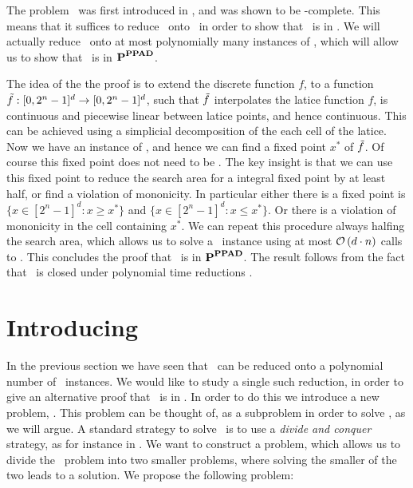 The problem \Brouwer\ was first introduced in , and was shown to be \PPAD-complete. This means that it suffices to reduce \Tarski\ onto \Brouwer\ in order to show that \Tarski\ is in \PPAD. We will actually reduce \Tarski\ onto at most polynomially many instances of \Brouwer, which will allow us to show that \Tarski\ is in $\textbf{P}^{\textbf{PPAD}}$.

The idea of the the proof is to extend the discrete function $f$, to a function $\Tilde{f} : [0, 2^n - 1]^d \rightarrow [0, 2^n - 1]^d$, such that $\Tilde{f}$ interpolates the latice function $f$, is continuous and piecewise linear between latice points, and hence continuous. This can be achieved using a simplicial decomposition of the each cell of the latice. Now we have an instance of \Brouwer, and hence we can find a fixed point $x^*$ of $\Tilde{f}$. Of course this fixed point does not need to be .
The key insight is that we can use this fixed point to reduce the search area for a integral fixed point by at least half, or find a violation of mononicity. In particular either there is a fixed point is $\{x \in [2^n-1]^d : x \geq x^*\}$ and $\{x \in [2^n-1]^d : x \leq x^*\}$. Or there is a violation of mononicity in the cell containing $x^*$.
We can repeat this procedure always halfing the search area, which allows us to solve a \Tarski\ instance using at most $\mathcal{O}\left(d \cdot n\right)$ calls to \Brouwer. This concludes the proof that \Tarski\ is in $\textbf{P}^{\textbf{PPAD}}$. The result follows from the fact that \PPAD\ is closed under polynomial time reductions .

\section{Introducing \Tarskistar}

In the previous section we have seen that \Tarski\ can be reduced onto a polynomial number of \Brouwer\ instances. We would like to study a single such reduction, in order to give an alternative proof that \Tarski\ is in \PPAD. In order to do this we introduce a new problem, \Tarskistar. This problem can be thought of, as a subproblem in order to solve \Tarski, as we will argue. A standard strategy to solve \Tarski\ is to use a \emph{divide and conquer} strategy, as for instance in . We want to construct a problem, which allows us to divide the \Tarski\ problem into two smaller problems, where solving the smaller of the two leads to a solution. We propose the following problem:

